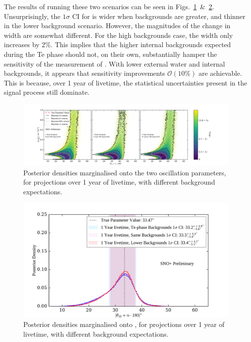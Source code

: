 The results of running these two scenarios can be seen in Figs.~\ref{fig:2D_posteriors_low_vs_hi_backs}~\&~\ref{fig:1D_posteriors_low_vs_hi_backs}. Unsurprisingly, the $1\sigma$ CI for \tonetwo{} is wider when backgrounds are greater, and thinner in the lower background scenario. However, the magnitudes of the change in width are somewhat different. For the high backgrounds case, the width only increases by 2\%. This implies that the higher internal backgrounds expected during the Te phase should not, on their own, substantially hamper the sensitivity of the measurement of \tonetwo{}. With lower external water and internal  backgrounds, it appears that sensitivity improvements $\mathcal{O}(10\%)$ are achievable. This is because, over 1 year of livetime, the statistical uncertainties present in the signal process still dominate.

\begin{figure}
    \centering
    \includegraphics[width=\textwidth]{6_SolarAnalysis/images/steve_style_contours_projections_low_vs_hi_1yr.png}
    \caption[Posterior densities marginalised onto the two oscillation parameters, for projections over 1 year of livetime, with different background expectations]
    {Posterior densities marginalised onto the two oscillation parameters, for projections over 1 year of livetime, with different background expectations.}
    \label{fig:2D_posteriors_low_vs_hi_backs}
\end{figure}

\begin{figure}[!th]
    \centering
    \includegraphics[width=\textwidth]{6_SolarAnalysis/images/theta_12_comparison_projections_low_vs_Te_backs_1yr.pdf}
    \caption{Posterior densities marginalised onto \tonetwo{}, for projections over 1 year of livetime, with different background expectations.}
    \label{fig:1D_posteriors_low_vs_hi_backs}
\end{figure}

